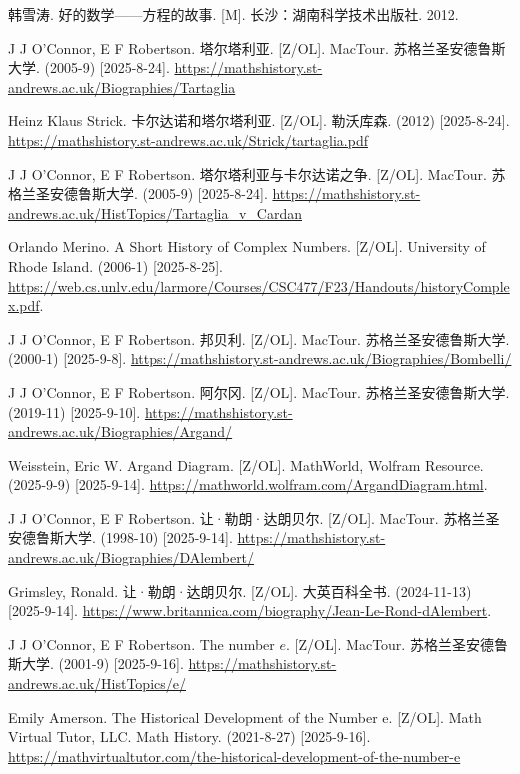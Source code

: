 韩雪涛. 好的数学——方程的故事. [M]. 长沙：湖南科学技术出版社. 2012. %

J J O'Connor, E F Robertson. 塔尔塔利亚. [Z/OL]. MacTour. 苏格兰圣安德鲁斯大学. (2005-9) [2025-8-24]. \url{https://mathshistory.st-andrews.ac.uk/Biographies/Tartaglia}

Heinz Klaus Strick. 卡尔达诺和塔尔塔利亚. [Z/OL]. 勒沃库森. (2012) [2025-8-24]. \url{https://mathshistory.st-andrews.ac.uk/Strick/tartaglia.pdf}

J J O'Connor, E F Robertson. 塔尔塔利亚与卡尔达诺之争. [Z/OL]. MacTour. 苏格兰圣安德鲁斯大学. (2005-9) [2025-8-24]. \url{https://mathshistory.st-andrews.ac.uk/HistTopics/Tartaglia_v_Cardan} %

Orlando Merino. A Short History of Complex Numbers. [Z/OL]. University of Rhode Island. (2006-1) [2025-8-25]. \url{https://web.cs.unlv.edu/larmore/Courses/CSC477/F23/Handouts/historyComplex.pdf}.

J J O'Connor, E F Robertson. 邦贝利. [Z/OL]. MacTour. 苏格兰圣安德鲁斯大学. (2000-1) [2025-9-8]. \url{https://mathshistory.st-andrews.ac.uk/Biographies/Bombelli/}

J J O'Connor, E F Robertson. 阿尔冈. [Z/OL]. MacTour. 苏格兰圣安德鲁斯大学. (2019-11) [2025-9-10]. \url{https://mathshistory.st-andrews.ac.uk/Biographies/Argand/}

Weisstein, Eric W. Argand Diagram. [Z/OL]. MathWorld, Wolfram Resource. (2025-9-9) [2025-9-14]. \url{https://mathworld.wolfram.com/ArgandDiagram.html}.

J J O'Connor, E F Robertson. 让·勒朗·达朗贝尔. [Z/OL]. MacTour. 苏格兰圣安德鲁斯大学. (1998-10) [2025-9-14]. \url{https://mathshistory.st-andrews.ac.uk/Biographies/DAlembert/}

Grimsley, Ronald. 让·勒朗·达朗贝尔. [Z/OL]. 大英百科全书. (2024-11-13) [2025-9-14]. \url{https://www.britannica.com/biography/Jean-Le-Rond-dAlembert}.

J J O'Connor, E F Robertson. The number $e$. [Z/OL]. MacTour. 苏格兰圣安德鲁斯大学. (2001-9) [2025-9-16]. \url{https://mathshistory.st-andrews.ac.uk/HistTopics/e/}

Emily Amerson. The Historical Development of the Number e. [Z/OL]. Math Virtual Tutor, LLC. Math History. (2021-8-27) [2025-9-16]. \url{https://mathvirtualtutor.com/the-historical-development-of-the-number-e}

